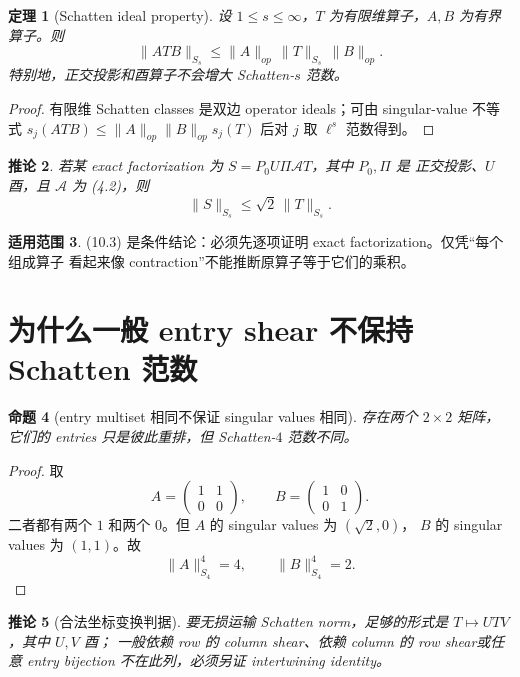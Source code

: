 \documentclass[11pt,a4paper]{ctexart}
\newtheorem{theorem}{定理}[section]
\newtheorem{corollary}[theorem]{推论}
\newtheorem{proposition}[theorem]{命题}
\theoremstyle{definition}
\newtheorem{remark}[theorem]{适用范围}
\newcommand{\1}{\mathbf 1}
\begin{document}
\begin{theorem}[Schatten ideal property]
设 $1\le s\le\infty$，$T$ 为有限维算子，$A,B$ 为有界算子。则
\[
\boxed{
\|ATB\|_{S_s}\le\|A\|_{op}\,\|T\|_{S_s}\,\|B\|_{op}.}
\tag{10.2}
\]
特别地，正交投影和酉算子不会增大 Schatten-$s$ 范数。
\end{theorem}

\begin{proof}
有限维 Schatten classes 是双边 operator ideals；可由 singular-value
不等式 $s_j(ATB)\le\|A\|_{op}\|B\|_{op}s_j(T)$ 后对 $j$ 取 $\ell^s$ 范数得到。
\end{proof}

\begin{corollary}
若某 exact factorization 为 $S=P_0U\Pi\mathcal AT$，其中 $P_0,\Pi$ 是
正交投影、$U$ 酉，且 $\mathcal A$ 为 (4.2)，则
\[
\|S\|_{S_s}\le\sqrt2\,\|T\|_{S_s}.
\tag{10.3}
\]
\end{corollary}

\begin{remark}
(10.3) 是条件结论：必须先逐项证明 exact factorization。仅凭“每个组成算子
看起来像 contraction”不能推断原算子等于它们的乘积。
\end{remark}

\section{为什么一般 entry shear 不保持 Schatten 范数}

\begin{proposition}[entry multiset 相同不保证 singular values 相同]
存在两个 $2\times2$ 矩阵，它们的 entries 只是彼此重排，但 Schatten-$4$ 范数不同。
\end{proposition}

\begin{proof}
取
\[
A=\begin{pmatrix}1&1\\0&0\end{pmatrix},\qquad
B=\begin{pmatrix}1&0\\0&1\end{pmatrix}.
\]
二者都有两个 $1$ 和两个 $0$。但 $A$ 的 singular values 为 $(\sqrt2,0)$，
$B$ 的 singular values 为 $(1,1)$。故
\[
\|A\|_{S_4}^4=4,
\qquad
\|B\|_{S_4}^4=2.
\]
\end{proof}

\begin{corollary}[合法坐标变换判据]
要无损运输 Schatten norm，足够的形式是 $T\mapsto UTV$，其中 $U,V$ 酉；
一般依赖 row 的 column shear、依赖 column 的 row shear或任意 entry bijection
不在此列，必须另证 intertwining identity。
\end{corollary}
\end{document}
